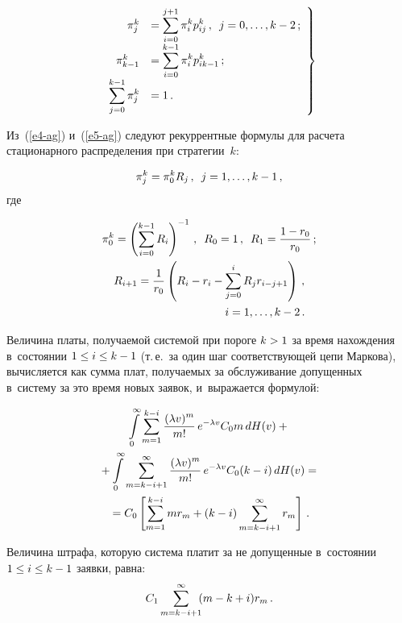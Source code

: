 \begin{multicols}{2}
\noindent
  \begin{equation}
  \left.
  \begin{array}{rl}
  \pi_j^k &= \displaystyle \sum\limits_{i=0}^{j+1} \pi_i^k p^k_{ij}\,,\enskip 
j=0,\ldots, k-2\,;\\[6pt]
  \pi^k_{k-1} &=\displaystyle  \sum\limits_{i=0}^{k-1} \pi_i^k p^k_{ik-1}\,;\\[6pt]
  \displaystyle  \sum\limits_{j=0}^{k-1} \pi_j^k &= 1\,.
  \end{array}
  \right\}
  \label{e5-ag}
  \end{equation}
  
  Из~(\ref{e4-ag}) и~(\ref{e5-ag}) следуют рекуррентные формулы для расчета 
стационарного распределения при стратегии~$k$:

\noindent
  \begin{equation}
  \pi_j^k = \pi_0^k R_j\,,\enskip j=1,\ldots, k-1\,,
  \label{e6-ag}
  \end{equation}
где

\noindent
\begin{gather*}
   \pi_0^k =\left( \sum\limits_{i=0}^{k-1} R_i\right)^{-1}\,,\enskip R_0=1\,,\enskip R_1= \fr{1-r_0}{r_0}\,;\\
   R_{i+1} =\fr{1}{r_0}\left( R_i-r_i -\sum\limits_{j=0}^i R_j r_{i-j+1}\right)\,,\\
    \hspace*{35mm}i=1,\ldots, k-2\,.
   \end{gather*}
  
  
  Величина платы, получаемой системой при пороге $k\hm>1$ за время 
нахождения в~состоянии $1\hm\leq i \hm\leq k-1$ (т.\,е.\ за один шаг 
соответствующей цепи Маркова), вычисляется как сумма плат, получа\-емых за 
обслуживание допущенных в~систему за это время новых заявок, и~выражается 
формулой:

\noindent
  \begin{multline}
  \int\limits_0^\infty \sum\limits_{m=1}^{k-i} \displaystyle\frac{\displaystyle (\lambda v)^m\mathstrut}{\displaystyle m!\mathstrut}\,
  e^{-\lambda v} C_0 m\,dH(v) + {}\\
{}+\int\limits_0^\infty \sum\limits_{m=k-i+1}^\infty 
\displaystyle\frac{\displaystyle (\lambda v)^m\mathstrut}{\displaystyle m!\mathstrut}\, e^{-\lambda v} C_0 (k-i)\,dH(v)={}\\
  {}=C_0 \left[ \sum\limits_{m=1}^{k-i} mr_m +(k-i) 
  \sum\limits^\infty_{m=k-i+1} r_m\right]\,.
  \label{e7-ag}
  \end{multline}
  
  Величина штрафа, которую система платит за не допущенные в~состоянии 
$1\hm\leq i\hm\leq k\hm-1$ заявки, равна:
  \begin{equation}
  C_1 \sum\limits_{m=k-i+1}^\infty \hspace*{-1mm}(m-k+i) r_m\,.
  \label{e8-ag}
  \end{equation}
  

\end{multicols}
